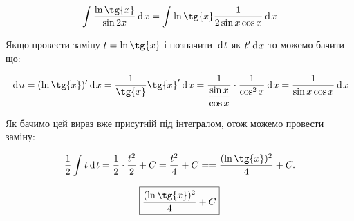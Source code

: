 {}

$$
  \int \dfrac{\ln{\tg{x}}}{\sin{2x}}\d{x}
= \int \ln{\tg{x}} \dfrac{1}{2\sin{x}\cos{x}}\d{x}

$$

Якщо провести заміну $t = \ln{\tg{x}}$ і позначити $\hspace{2pt}\text{d}\hspace{1pt}{t}$ як $t'\hspace{2pt}\text{d}\hspace{1pt}{x}$ то можемо бачити що:

$$
\d{u}
= (\ln{\tg{x}})'\d{x} = \dfrac{1}{\tg{x}} \tg{x}' \d{x}
= \dfrac{1}{\dfrac{\sin{x}}{\cos{x}}} \cdot   \dfrac{1}{\cos^2{x}}  \d{x}
= \dfrac{1}{\sin{x}\cos{x}}  \d{x}
$$

Як бачимо цей вираз вже присутній під інтегралом, отож можемо провести заміну:

$$
  \dfrac{1}{2} \int t\d{t}
= \dfrac{1}{2} \cdot \dfrac{t^2}{2} + C
= \dfrac{t^2}{4} + C =
= \dfrac{(\ln{\tg{x}})^2}{4} + C.
$$

$$
\boxed{\dfrac{(\ln{\tg{x}})^2}{4} + C}
$$
